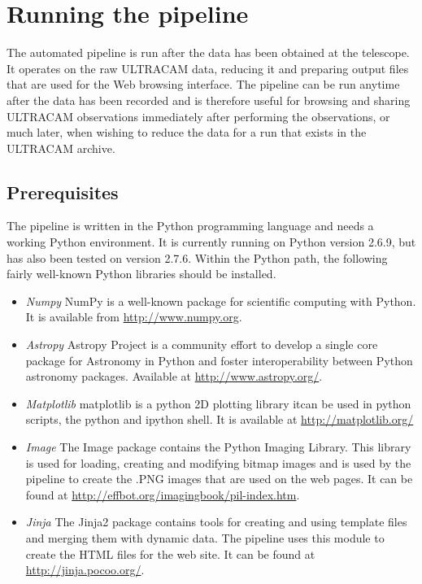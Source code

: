 \section{Running the pipeline}
The automated pipeline is run after the data has been obtained at the telescope. It operates on the raw ULTRACAM data, reducing it and preparing output files that are used for the Web browsing interface. The pipeline can be run anytime after the data has been recorded and is therefore useful for browsing and sharing ULTRACAM observations immediately after performing the observations, or much later, when wishing to reduce the data for a run that exists in the ULTRACAM archive.

\subsection{Prerequisites}
The pipeline is written in the Python programming language and needs a working Python environment. It is currently running on Python version 2.6.9, but has also been tested on version 2.7.6. Within the Python path, the following fairly well-known Python libraries should be installed. 
\begin{itemize}
  \item \emph{Numpy} NumPy is a well-known package for scientific computing with Python. It is available from \url{http://www.numpy.org}.
  \item \emph{Astropy} Astropy Project is a community effort to develop a single core package for Astronomy in Python and foster interoperability between Python astronomy packages. Available at \url{http://www.astropy.org/}.
  \item \emph{Matplotlib} matplotlib is a python 2D plotting library itcan be used in python scripts, the python and ipython shell. It is available at  \url{http://matplotlib.org/}
  \item \emph{Image} The Image package contains the Python Imaging Library. This library is used for loading, creating and modifying bitmap images and is used by the pipeline to create the .PNG images that are used on the web pages. It can be found at \url{http://effbot.org/imagingbook/pil-index.htm}.
  \item \emph{Jinja} The Jinja2 package contains tools for creating and using template files and merging them with dynamic data. The pipeline uses this module to create the HTML files for the web site. It can be found at \url{http://jinja.pocoo.org/}.

\end{itemize}
